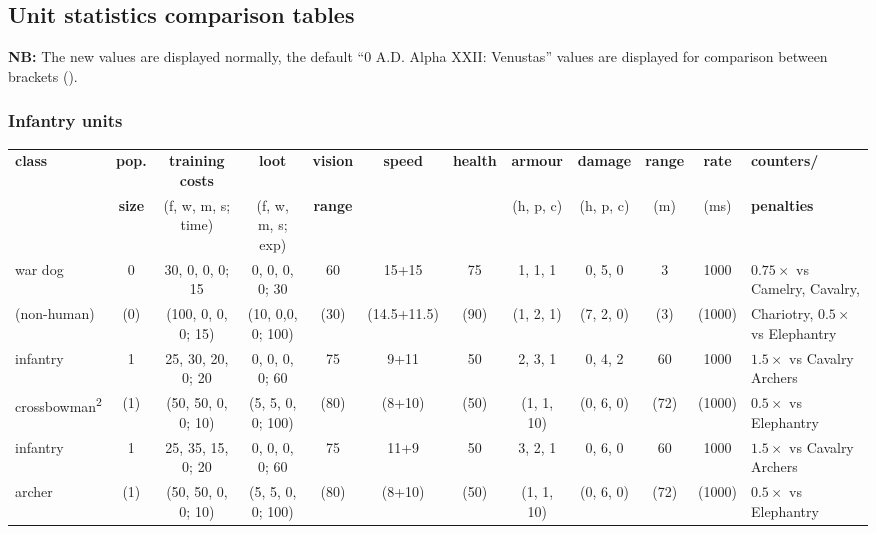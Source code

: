 \documentclass{article}
\begin{document}
\begin{landscape}
\subsection{Unit statistics comparison tables}
\textbf{NB:} The new values are displayed normally, the default ``0 A.D. Alpha XXII: Venustas'' values are displayed for comparison between brackets ().

\subsubsection{Infantry units}
\begin{tabular}{l|ccc|cccc|ccc|l}
{\bf class} & {\bf pop.} & {\bf training costs} & {\bf loot}          & {\bf vision} & {\bf speed} & {\bf health} & {\bf armour} & {\bf damage} & {\bf range} & {\bf rate} & {\bf counters/} \\
            & {\bf size} & {(f, w, m, s; time)} & {(f, w, m, s; exp)} & {\bf range}  &             &              & {(h, p, c)}  & {(h, p, c)}  & {(m)}       & {(ms)}     & {\bf penalties} \\
\hline
war dog                            &  0  &  30,  0,  0, 0; 15  &  0, 0, 0, 0;  30  &  60  &    15+15    &   75  &   1,  1,  1  &  0,  5,  0  &   3  &  1000  & $0.75\times$ vs Camelry, Cavalry,\\
(non-human)                        & (0) & (100, 0,  0, 0; 15) & (10, 0,0, 0; 100) & (30) & (14.5+11.5) &  (90) &  (1,  2,  1) & (7,  2,  0) &  (3) & (1000) & Chariotry, $0.5\times$ vs Elephantry\\
\hline
infantry                           &  1  &  25, 30, 20, 0; 20  &  0, 0, 0, 0;  60  &  75  &     9+11    &   50  &   2,  3,  1  &  0,  4,  2  &  60  &  1000  & $1.5\times$ vs Cavalry Archers \\
crossbowman\textsuperscript{2}     & (1) & (50, 50,  0, 0; 10) & (5, 5, 0, 0; 100) & (80) &    (8+10)   &  (50) &  (1,  1, 10) & (0,  6,  0) & (72) & (1000) & $0.5\times$ vs Elephantry \\
\hline
infantry                           &  1  &  25, 35, 15, 0; 20  &  0, 0, 0, 0;  60  &  75  &    11+9     &   50  &   3,  2,  1  &  0,  6,  0  &  60  &  1000  & $1.5\times$ vs Cavalry Archers \\
archer                             & (1) & (50, 50,  0, 0; 10) & (5, 5, 0, 0; 100) & (80) &    (8+10)   &  (50) &  (1,  1, 10) & (0,  6,  0) & (72) & (1000) & $0.5\times$ vs Elephantry \\

\end{tabular}
\end{landscape}
\end{document}
